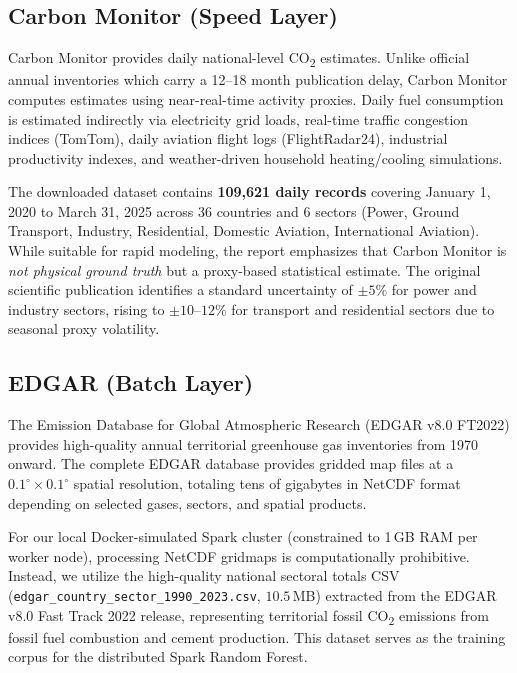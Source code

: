 \documentclass[conference]{IEEEtran}
\begin{document}
\subsection{Carbon Monitor (Speed Layer)}
Carbon Monitor \cite{carbonmonitor2020} provides daily national-level CO\textsubscript{2} estimates. Unlike official annual inventories which carry a 12--18 month publication delay, Carbon Monitor computes estimates using near-real-time activity proxies. Daily fuel consumption is estimated indirectly via electricity grid loads, real-time traffic congestion indices (TomTom), daily aviation flight logs (FlightRadar24), industrial productivity indexes, and weather-driven household heating/cooling simulations.

The downloaded dataset contains \textbf{109{,}621 daily records} covering January 1, 2020 to March 31, 2025 across 36 countries and 6 sectors (Power, Ground Transport, Industry, Residential, Domestic Aviation, International Aviation). While suitable for rapid modeling, the report emphasizes that Carbon Monitor is \textit{not physical ground truth} but a proxy-based statistical estimate. The original scientific publication identifies a standard uncertainty of $\pm 5\%$ for power and industry sectors, rising to $\pm 10\text{--}12\%$ for transport and residential sectors due to seasonal proxy volatility.

\subsection{EDGAR (Batch Layer)}
The Emission Database for Global Atmospheric Research (EDGAR v8.0 FT2022) \cite{edgar2021} provides high-quality annual territorial greenhouse gas inventories from 1970 onward. The complete EDGAR database provides gridded map files at a $0.1^\circ \times 0.1^\circ$ spatial resolution, totaling tens of gigabytes in NetCDF format depending on selected gases, sectors, and spatial products. 

For our local Docker-simulated Spark cluster (constrained to 1\,GB RAM per worker node), processing NetCDF gridmaps is computationally prohibitive. Instead, we utilize the high-quality national sectoral totals CSV (\texttt{edgar\_country\_sector\_1990\_2023.csv}, $10.5$\,MB) extracted from the EDGAR v8.0 Fast Track 2022 release, representing territorial fossil CO\textsubscript{2} emissions from fossil fuel combustion and cement production. This dataset serves as the training corpus for the distributed Spark Random Forest.
\end{document}
